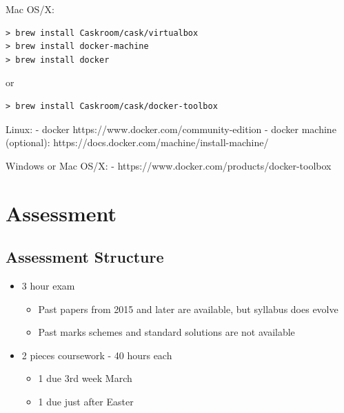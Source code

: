 Mac OS/X:

\begin{verbatim}
> brew install Caskroom/cask/virtualbox
> brew install docker-machine
> brew install docker
\end{verbatim}

or

\begin{verbatim}
> brew install Caskroom/cask/docker-toolbox
\end{verbatim}

Linux: - docker https://www.docker.com/community-edition - docker
machine (optional): https://docs.docker.com/machine/install-machine/

Windows or Mac OS/X: - https://www.docker.com/products/docker-toolbox

\section{Assessment}\label{assessment}

\subsection{Assessment Structure}\label{assessment-structure}

\begin{itemize}
\itemsep1pt\parskip0pt
\item
  3 hour exam

  \begin{itemize}
  \itemsep1pt\parskip0pt
  \item
    Past papers from 2015 and later are available, but syllabus does
    evolve
  \item
    Past marks schemes and standard solutions are not available
  \end{itemize}
\item
  2 pieces coursework - 40 hours each

  \begin{itemize}
  \itemsep1pt\parskip0pt
  \item
    1 due 3rd week March
  \item
    1 due just after Easter
  \end{itemize}
\end{itemize}
